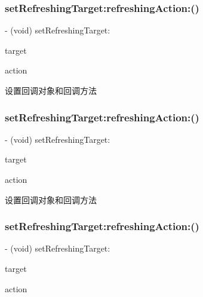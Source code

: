 \subsubsection{\texorpdfstring{set\+Refreshing\+Target\+:refreshing\+Action\+:()}{setRefreshingTarget:refreshingAction:()}\hspace{0.1cm}{\footnotesize\ttfamily [1/3]}}
{\footnotesize\ttfamily -\/ (void) set\+Refreshing\+Target\+: \begin{DoxyParamCaption}\item[{(id)}]{target }\item[{refreshingAction:(S\+EL)}]{action }\end{DoxyParamCaption}}

设置回调对象和回调方法 \mbox{\label{interface_m_j_refresh_component_a9af3d33329e4ed8f7aed41eed601be99}} 
\subsubsection{\texorpdfstring{set\+Refreshing\+Target\+:refreshing\+Action\+:()}{setRefreshingTarget:refreshingAction:()}\hspace{0.1cm}{\footnotesize\ttfamily [2/3]}}
{\footnotesize\ttfamily -\/ (void) set\+Refreshing\+Target\+: \begin{DoxyParamCaption}\item[{(id)}]{target }\item[{refreshingAction:(S\+EL)}]{action }\end{DoxyParamCaption}}

设置回调对象和回调方法 \mbox{\label{interface_m_j_refresh_component_a9af3d33329e4ed8f7aed41eed601be99}} 
\subsubsection{\texorpdfstring{set\+Refreshing\+Target\+:refreshing\+Action\+:()}{setRefreshingTarget:refreshingAction:()}\hspace{0.1cm}{\footnotesize\ttfamily [3/3]}}
{\footnotesize\ttfamily -\/ (void) set\+Refreshing\+Target\+: \begin{DoxyParamCaption}\item[{(id)}]{target }\item[{refreshingAction:(S\+EL)}]{action }\end{DoxyParamCaption}}

